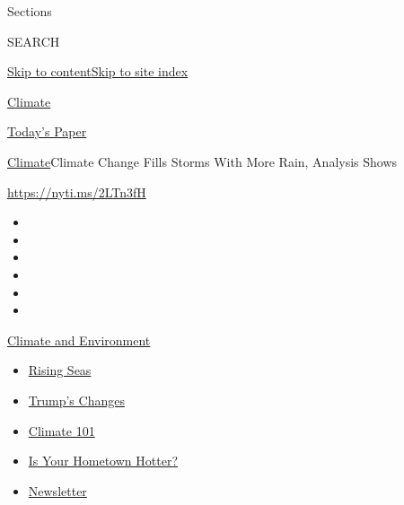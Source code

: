 Sections

SEARCH

\protect\hyperlink{site-content}{Skip to
content}\protect\hyperlink{site-index}{Skip to site index}

\href{https://www.nytimes3xbfgragh.onion/section/climate}{Climate}

\href{https://myaccount.nytimes3xbfgragh.onion/auth/login?response_type=cookie\&client_id=vi}{}

\href{https://www.nytimes3xbfgragh.onion/section/todayspaper}{Today's
Paper}

\href{/section/climate}{Climate}\textbar{}Climate Change Fills Storms
With More Rain, Analysis Shows

\url{https://nyti.ms/2LTn3fH}

\begin{itemize}
\item
\item
\item
\item
\item
\item
\end{itemize}

\href{https://www.nytimes3xbfgragh.onion/section/climate?action=click\&pgtype=Article\&state=default\&region=TOP_BANNER\&context=storylines_menu}{Climate
and Environment}

\begin{itemize}
\tightlist
\item
  \href{https://www.nytimes3xbfgragh.onion/2020/07/30/climate/sea-level-inland-floods.html?action=click\&pgtype=Article\&state=default\&region=TOP_BANNER\&context=storylines_menu}{Rising
  Seas}
\item
  \href{https://www.nytimes3xbfgragh.onion/interactive/2020/climate/trump-environment-rollbacks.html?action=click\&pgtype=Article\&state=default\&region=TOP_BANNER\&context=storylines_menu}{Trump's
  Changes}
\item
  \href{https://www.nytimes3xbfgragh.onion/interactive/2020/04/19/climate/climate-crash-course-1.html?action=click\&pgtype=Article\&state=default\&region=TOP_BANNER\&context=storylines_menu}{Climate
  101}
\item
  \href{https://www.nytimes3xbfgragh.onion/interactive/2018/08/30/climate/how-much-hotter-is-your-hometown.html?action=click\&pgtype=Article\&state=default\&region=TOP_BANNER\&context=storylines_menu}{Is
  Your Hometown Hotter?}
\item
  \href{https://www.nytimes3xbfgragh.onion/newsletters/climate-change?action=click\&pgtype=Article\&state=default\&region=TOP_BANNER\&context=storylines_menu}{Newsletter}
\end{itemize}

